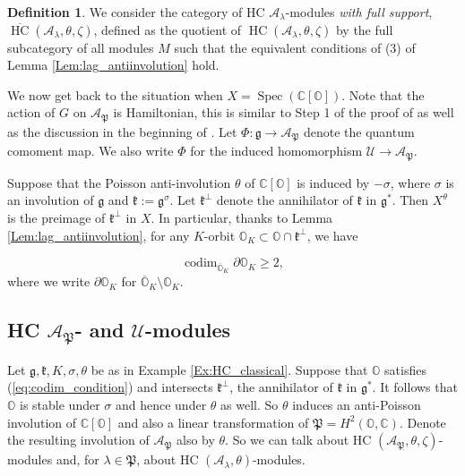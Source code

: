 \documentclass[12pt]{amsart}
\newcommand{\C}{\mathbb{C}}
\newcommand{\A}{\mathcal{A}}
\newcommand{\U}{\mathcal{U}}
\newcommand{\g}{\mathfrak{g}}
\newcommand{\Orb}{\mathbb{O}}
\newcommand{\kf}{\mathfrak{k}}
\newcommand{\HC}{\operatorname{HC}}
\newcommand{\param}{\mathfrak{P}}
\theoremstyle{definition}
\newtheorem{defi}[Thm]{Definition}
\numberwithin{equation}{section}
\begin{document}
\begin{defi}\label{defi:HC_full_support}
We consider the category of HC $\A_\lambda$-modules
{\it with full support},  $\overline{\HC}(\A_\lambda,\theta,\zeta)$, defined as the quotient of $\HC(\A_\lambda,\theta,\zeta)$ by the full
subcategory of all modules $M$ such that the equivalent conditions of (3) of Lemma
\ref{Lem:lag_antiinvolution} hold.
\end{defi}

We now get back to the situation when $X=\operatorname{Spec}(\C[\Orb])$.
Note that the action of $G$ on $\A_{\param}$ is Hamiltonian, this is similar to Step 1 of the proof
of \cite[Proposition 4.5]{orbit} as well as the discussion in the beginning of
\cite[Section 5.3]{orbit}. Let $\Phi:\g\rightarrow \A_{\param}$
denote the quantum comoment map. We also write $\Phi$ for the induced homomorphism $\U\rightarrow
\A_{\param}$.

Suppose that the Poisson anti-involution $\theta$ of $\C[\Orb]$ is induced by $-\sigma$, where $\sigma$ is an involution of $\g$ and $\kf:=\g^\sigma$. Let $\kf^\perp$
denote the annihilator of $\kf$ in $\g^*$. Then $X^\theta$ is the preimage of $\kf^\perp$ in $X$.
In particular, thanks to Lemma \ref{Lem:lag_antiinvolution},
for any $K$-orbit $\Orb_K\subset \Orb\cap \kf^\perp$, we have

\begin{equation}\label{eq:codim_condition_K}
\operatorname{codim}_{\overline{\Orb}_K}\partial\Orb_K\geqslant 2,
\end{equation}
where we write $\partial\Orb_K$ for $\overline{\Orb}_K\setminus \Orb_K$.

\subsection{HC $\A_{\param}$- and $\U$-modules}
Let $\g,\kf,K,\sigma,\theta$ be as in Example \ref{Ex:HC_classical}.
Suppose that $\Orb$ satisfies (\ref{eq:codim_condition}) and intersects $\kf^\perp$, the annihilator
of $\kf$ in $\g^*$. It follows that $\Orb$ is stable under $\sigma$ and hence under $\theta$ as well.
So $\theta$ induces an anti-Poisson involution of $\C[\Orb]$ and also a linear transformation of
$\param=H^2(\Orb,\C)$.
Denote the resulting involution of $\A_{\param}$ also by $\theta$. So we can talk about
HC $(\A_{\param},\theta,\zeta)$-modules and, for $\lambda\in \param$, about HC $(\A_\lambda,\theta)$-modules.
\end{document}
